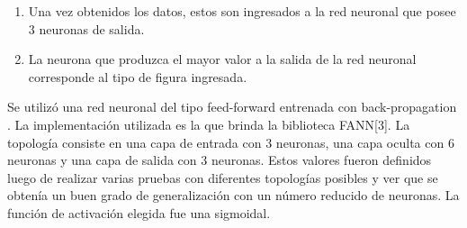 \documentclass[pdftex,a4paper,10.5pt]{article}
\begin{document}
\begin{enumerate}
\begin{itemize}
  					  \begin{equation} s_{2} = \frac { Area Blob }
				                      { Area R_{m}}		\end{equation}

					  $ R{m}:  $	 \textit{ Rect\'angulo de \'area m\'inima que contiene al Blob. }

                      \item N\'umero de v\'ertices del pol\'igono simplificado que
                      define al blob. Cuando se detecta un blob, se le pide a la
                      biblioteca utilizada un pol\'igono que define a ese blob
                      (una lista de puntos x,y). El problema que surge es que
                      esa lista contiene muchos puntos que pueden ser considerados redundantes,
                      por lo que se aplica un algoritmo \cite{ramerDouglas} para la
                      reducci\'on de los mismos que elimina los puntos que no son
                      necesarios sin deformar al pol\'igono.
                      
  					  \begin{equation} s_{3} = \frac { \#Vertices }
				                      { K  }		\end{equation}

					  $ K:  $	 \textit{M\'axima cantidad de v\'ertices para un pol\'igono simplificado. }
                      
 					\end{itemize} 
				\item   Una vez obtenidos los datos, estos son ingresados a la red neuronal
				que posee 3 neuronas de salida.
				\item La neurona que produzca el mayor valor a la salida de la red neuronal corresponde
				al tipo de figura ingresada.

            \end{enumerate}      

Se utiliz\'o una red neuronal del tipo feed-forward entrenada con back-propagation \cite{martinez}. La implementaci\'on utilizada es la que brinda la biblioteca FANN[3]. La topolog\'ia consiste en una capa de entrada con 3 neuronas, una capa oculta con 6 neuronas y una capa de salida con 3 neuronas. Estos valores fueron  definidos luego de realizar varias pruebas con diferentes topolog\'ias posibles y ver que se obten\'ia 
un buen grado de generalizaci\'on con un n\'umero reducido de neuronas. La funci\'on de activaci\'on 
elegida fue una sigmoidal.
\end{document}
